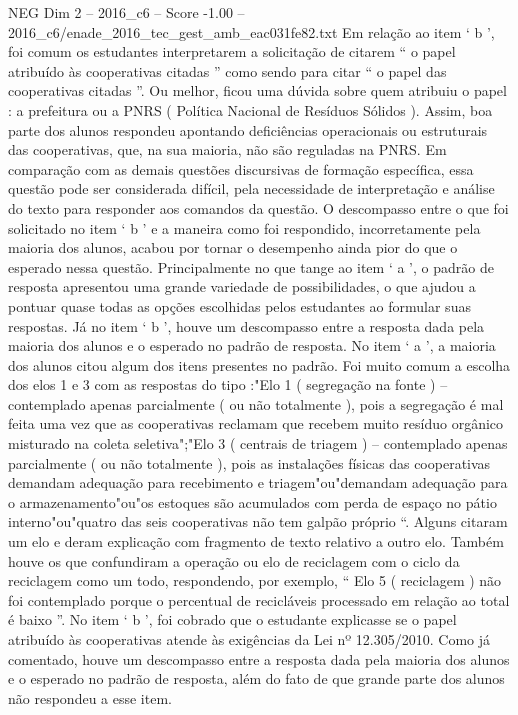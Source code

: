 \begin{textsample}{NEG Dim 2 – 2016\_c6 – Score -1.00 – 2016\_c6/enade\_2016\_tec\_gest\_amb\_eac031fe82.txt}
Em relação ao item ‘ b ’, foi comum os estudantes interpretarem a solicitação de citarem “ o papel atribuído às cooperativas citadas ” como sendo para citar “ o papel das cooperativas citadas ”.
Ou melhor, ficou uma dúvida sobre quem atribuiu o papel : a prefeitura ou a PNRS ( Política Nacional de Resíduos Sólidos ).
Assim, boa parte dos alunos respondeu apontando deficiências operacionais ou estruturais das cooperativas, que, na sua maioria, não são reguladas na PNRS.
Em comparação com as demais questões discursivas de formação específica, essa questão pode ser considerada difícil, pela necessidade de interpretação e análise do texto para responder aos comandos da questão.
O descompasso entre o que foi solicitado no item ‘ b ’ e a maneira como foi respondido, incorretamente pela maioria dos alunos, acabou por tornar o desempenho ainda pior do que o esperado nessa questão.
Principalmente no que tange ao item ‘ a ’, o padrão de resposta apresentou uma grande variedade de possibilidades, o que ajudou a pontuar quase todas as opções escolhidas pelos estudantes ao formular suas respostas.
Já no item ‘ b ’, houve um descompasso entre a resposta dada pela maioria dos alunos e o esperado no padrão de resposta.
No item ‘ a ’, a maioria dos alunos citou algum dos itens presentes no padrão.
Foi muito comum a escolha dos elos 1 e 3 com as respostas do tipo :"Elo 1 ( segregação na fonte ) – contemplado apenas parcialmente ( ou não totalmente ), pois a segregação é mal feita uma vez que as cooperativas reclamam que recebem muito resíduo orgânico misturado na coleta seletiva";"Elo 3 ( centrais de triagem ) – contemplado apenas parcialmente ( ou não totalmente ), pois as instalações físicas das cooperativas demandam adequação para recebimento e triagem"ou"demandam adequação para o armazenamento"ou"os estoques são acumulados com perda de espaço no pátio interno"ou"quatro das seis cooperativas não tem galpão próprio “.
Alguns citaram um elo e deram explicação com fragmento de texto relativo a outro elo.
Também houve os que confundiram a operação ou elo de reciclagem com o ciclo da reciclagem como um todo, respondendo, por exemplo, “ Elo 5 ( reciclagem ) não foi contemplado porque o percentual de recicláveis processado em relação ao total é baixo ”.
No item ‘ b ’, foi cobrado que o estudante explicasse se o papel atribuído às cooperativas atende às exigências da Lei nº 12.305/2010.
Como já comentado, houve um descompasso entre a resposta dada pela maioria dos alunos e o esperado no padrão de resposta, além do fato de que grande parte dos alunos não respondeu a esse item.

\end{textsample}
